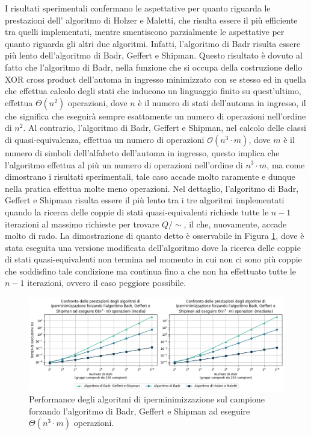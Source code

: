 \documentclass[a4paper,12pt]{report} %
\newcommand{\partitioned}[2]{#1\slash\!\!#2}  %
\newcommand{\bigo}[0]{\mathcal{O}}            %
\begin{document}
I risultati sperimentali confermano le aspettative per quanto riguarda le prestazioni dell'
algoritmo di Holzer e Maletti, che risulta essere il più efficiente tra quelli implementati, mentre smentiscono
parzialmente le aspettative per quanto riguarda gli altri due algoritmi. Infatti, l'algoritmo di Badr risulta
essere più lento dell'algoritmo di Badr, Geffert e Shipman. Questo risultato è dovuto al fatto che 
l'algoritmo di Badr, nella funzione che si occupa della costruzione dello XOR cross product dell'automa in
ingresso minimizzato con se stesso ed in quella che effettua calcolo degli stati che inducono un linguaggio
finito su quest'ultimo, effettua $\Theta(n^2)$ operazioni, dove $n$ è il numero di stati dell'automa in ingresso, il che significa che eseguirà sempre esattamente 
un numero di operazioni nell'ordine di $n^2$. Al contrario, l'algoritmo di Badr, Geffert e Shipman, nel calcolo delle classi di
quasi-equivalenza, effettua un numero di operazioni $\bigo(n^3 \cdot m)$, dove $m$ è il
numero di simboli dell'alfabeto dell'automa in ingresso, questo implica che l'algoritmo effettua al più
un numero di operazioni nell'ordine di $n^3 \cdot m$, ma come dimostrano i risultati sperimentali, tale caso
accade molto raramente e dunque nella pratica effettua molte meno operazioni.
Nel dettaglio, l'algoritmo di Badr, Geffert e Shipman risulta essere il più lento tra i tre algoritmi implementati
quando la ricerca delle coppie di stati quasi-equivalenti richiede tutte le $n-1$ iterazioni al massimo richieste
per trovare $\partitioned{Q}{\sim}$, il che, nuovamente, accade molto di rado. La dimostrazione di quanto detto è
osservabile in Figura \ref{fig:dfa-pcomparison-all-forced-lines}, dove è stata eseguita una versione modificata dell'algoritmo 
dove la ricerca delle coppie di stati quasi-equivalenti non termina nel momento in cui non ci sono più coppie
che soddisfino tale condizione ma continua fino a che non ha effettuato tutte le $n-1$ iterazioni, ovvero il caso
peggiore possibile.

\begin{figure}[!htb]
  \centering
  \includegraphics[width=1\linewidth]{images/performance_forced_all_line.png}
  \caption{\label{fig:dfa-pcomparison-all-forced-lines}Performance degli algoritmi di iperminimizzazione sul
  campione forzando l'algoritmo di Badr, Geffert e Shipman ad eseguire $\Theta(n^3 \cdot m)$ operazioni.}
\end{figure}
\end{document}

